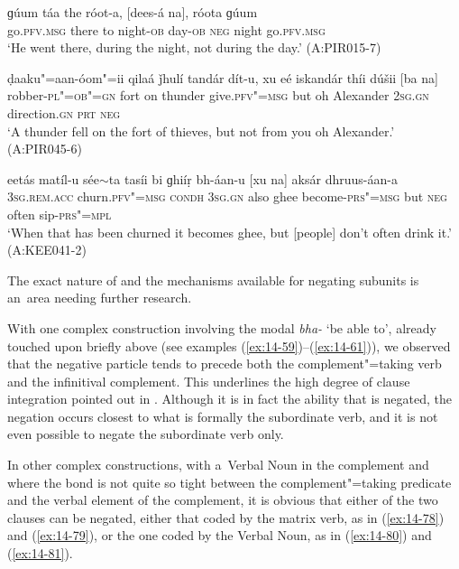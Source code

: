 \begin{exe}
\ex
\label{ex:14-75}
\gll ɡúum táa the róot-a, [dees-á na], róota  ɡúum \\
go.\textsc{pfv.msg} there to night-\textsc{ob} day-\textsc{ob} \textsc{neg} night  go.\textsc{pfv.msg}  \\
\glt `He went there, during the night, not during the day.' (A:PIR015-7)

\ex
\label{ex:14-76}
\gll ḍaaku"=aan-óom"=ii qilaá ǰhulí tandár dít-u, xu eé iskandár thíi dúšii [ba na] \\
robber-\textsc{pl"=ob"=gn} fort on thunder give.\textsc{pfv"=msg} but oh Alexander \textsc{2sg.gn} direction.\textsc{gn} \textsc{prt} \textsc{neg } \\
\glt `A thunder fell on the fort of thieves, but not from you oh Alexander.' (A:PIR045-6)

\ex
\label{ex:14-77}
\gll eetás matíl-u sée$\sim$ta tasíi bi ɡhiíṛ  bh-áan-u [xu na] aksár dhruus-áan-a \\
\textsc{3sg.rem.acc} churn.\textsc{pfv"=msg} \textsc{condh} \textsc{3sg.gn} also ghee  become-\textsc{prs"=msg} but \textsc{neg} often sip-\textsc{prs"=mpl}  \\
\glt `When that has been churned it becomes ghee, but [people] don't often drink it.' (A:KEE041-2)
\end{exe}

The exact nature of and the mechanisms available for negating subunits is an~area needing further research.


 With one complex construction involving the modal \textit{bha-} `be able to', already touched upon briefly above (see examples (\ref{ex:14-59})--(\ref{ex:14-61})), we observed that the negative particle tends to precede both the complement"=taking verb and the infinitival complement. This underlines the high degree of clause integration pointed out in . Although it is in fact the ability that is negated, the negation occurs closest to what is formally the subordinate verb, and it is not even possible to negate the subordinate verb only.


In other complex constructions, with a~Verbal Noun in the complement and where the bond is not quite so tight between the complement"=taking predicate and the verbal element of the complement, it is obvious that either of the two clauses can be negated, either that coded by the matrix verb, as in (\ref{ex:14-78}) and (\ref{ex:14-79}), or the one coded by the Verbal Noun, as in (\ref{ex:14-80}) and (\ref{ex:14-81}). 

